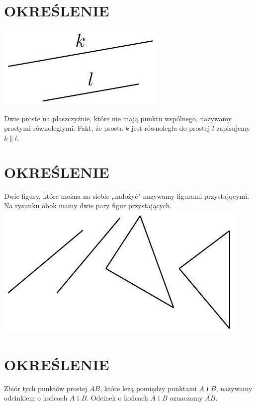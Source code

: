 \documentclass[10pt]{article}
\begin{document}
\section*{OKREŚLENIE}
\begin{center}
\includegraphics[max width=\textwidth]{2024_11_21_8f01584889ff06348ae7g-185(1)}
\end{center}

Dwie proste na płaszczyźnie, które nie mają punktu wspólnego, nazywamy prostymi równoleglymi. Fakt, że prosta \(k\) jest równoległa do prostej \(l\) zapisujemy \(k \| l\).

\section*{OKREŚLENIE}
Dwie figury, które można na siebie „nałożyć" nazywamy figurami przystajqcymi. Na rysunku obok mamy dwie pary figur przystających.\\
\includegraphics[max width=\textwidth, center]{2024_11_21_8f01584889ff06348ae7g-185}

\section*{OKREŚLENIE}
Zbiór tych punktów prostej \(A B\), które leżą pomiędzy punktami \(A\) i \(B\), nazywamy odcinkiem o końcach \(A\) i \(B\). Odcinek o końcach \(A\) i \(B\) oznaczamy \(\overline{A B}\).
\end{document}

